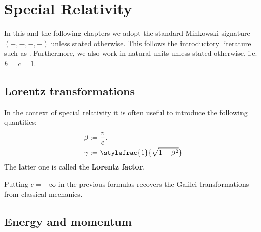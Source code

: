 \chapter{Special Relativity}

    In this and the following chapters we adopt the standard Minkowski signature $(+, -, -, -)$ unless stated otherwise. This follows the introductory literature such as \cite{Peskin, greiner_qft}. Furthermore, we also work in natural units unless stated otherwise, i.e. $\hbar = c = 1$.

\section{Lorentz transformations}

    \begin{notation}
        In the context of special relativity it is often useful to introduce the following quantities:
        \begin{align}
            \beta &:= \frac{v}{c}.\\
            \label{rel:lorentz_factor}
            \gamma &:= \stylefrac{1}{\sqrt{1 - \beta^2}}
        \end{align}
        The latter one is called the \textbf{Lorentz factor}.
    \end{notation}
    \begin{remark}
        Putting $c=+\infty$ in the previous formulas recovers the Galilei transformations from classical mechanics.
    \end{remark}

\section{Energy and momentum}

